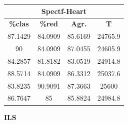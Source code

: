 \documentclass[11pt,a4paper]{article}
\theoremstyle{definition}
\begin{document}
\begin{tabbing}
{		\begin{tabular}{|c|c|c|c|}
			\hline
			\multicolumn{4}{|c|}{\textbf{Spectf-Heart}} \\ \hline
			\textbf{\%clas} & \textbf{\%red} & \textbf{Agr.} & \textbf{T} \\ \hline 
			87.1429 & 84.0909 & 85.6169 & 24765.9 \\ \hline
90 & 84.0909 & 87.0455 & 24605.9 \\ \hline
84.2857 & 81.8182 & 83.0519 & 24914.8 \\ \hline
88.5714 & 84.0909 & 86.3312 & 25037.6 \\ \hline
83.8235 & 90.9091 & 87.3663 & 25600 \\ \hline
86.7647 & 85 & 85.8824 & 24984.8 \\ \hline
		\end{tabular}
		}
	\end{tabbing}

	
	\textbf{ILS}
	
\end{document}
